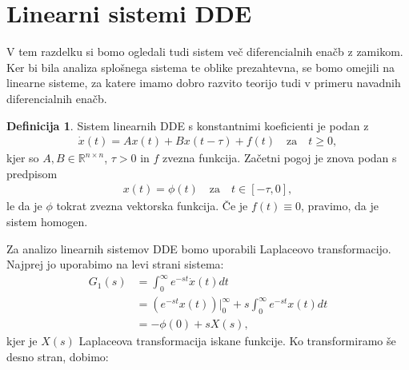 \documentclass[12pt,a4paper]{amsart}
\theoremstyle{definition} %
\newtheorem{definicija}{Definicija}[section]
\theoremstyle{plain} %
\newcommand{\R}{\mathbb R}
\begin{document}
\section{Linearni sistemi DDE}

V tem razdelku si bomo ogledali tudi sistem več diferencialnih enačb z zamikom. Ker bi bila analiza splošnega
sistema te oblike prezahtevna, se bomo omejili na linearne sisteme, za 
katere imamo dobro razvito teorijo tudi v primeru navadnih diferencialnih enačb.

\begin{definicija}
    Sistem linearnih DDE s konstantnimi koeficienti je podan z 
    \begin{equation} \label{eq5}
        \begin{split}
            \dot{x}(t)=Ax(t)+Bx(t-\tau)+f(t)\quad \text{za}\quad t\geq0,
        \end{split}
    \end{equation} kjer so
    $A,B\in\R^{n\times n}$, $\tau>0$ in $f$ zvezna funkcija. Začetni pogoj je znova podan s predpisom
    \begin{equation} \label{eq6}
        \begin{split}
            x(t)=\phi(t)\quad \text{za}\quad t\in [-\tau,0],
        \end{split}
    \end{equation}
    le da je $\phi$ tokrat zvezna vektorska funkcija. Če je $f(t)\equiv0$, pravimo,
    da je sistem homogen.
\end{definicija}
Za analizo linearnih sistemov DDE bomo uporabili Laplaceovo transformacijo. Najprej jo uporabimo na levi strani sistema:
\begin{equation*}
    \begin{split}
        G_1(s)&= \int_0^{\infty}e^{-st}\dot{x}(t)dt \\
            &= (e^{-st}x(t))\Bigr|_{0}^{\infty} + s\int_0^{\infty}e^{-st}x(t)dt \\
            &= -\phi(0) + sX(s),
    \end{split}      
\end{equation*}
kjer je $X(s)$ Laplaceova transformacija iskane funkcije.
Ko transformiramo še desno stran, dobimo:
\end{document}
